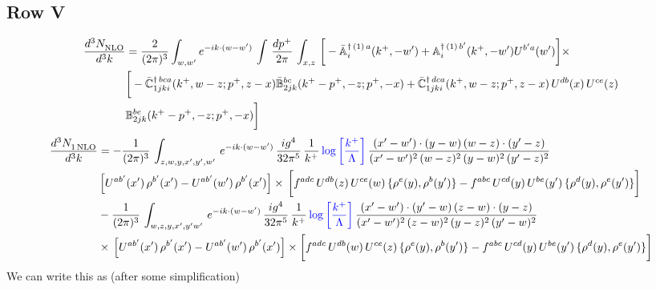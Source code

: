 \documentclass[9pt]{article}
\def\mf#1{\mathbb{#1}}
\numberwithin{equation}{section}
\begin{document}
\subsection{Row V}
\begin{align}
    \frac{d^{3}N_{\rm NLO}^{\rm}}{d^{3}k}  & = \frac{2}{(2\pi)^{3}}  \int_{w, w^\prime} e^{-ik\cdot (w-w')}\, \int\, \frac{dp^{+}}{2\pi}\,\int_{x,z}\, \bigg[-\bar{\mf{A}}^{\dagger\,(1)\,a}_{i}(k^{+},-w^{\prime})+\mf{A}^{\dagger\, (1)\, b^{\prime}}_{i}(k^{+},-w^{\prime})U^{b^{\prime}a}(w^{\prime})\bigg]\times\notag \\ & \bigg[-\Bar{\mf{C}}^{\dagger\, bca}_{1jki}(k^{+},w-z;p^{+},z-x)\Bar{\mf{B}}^{bc}_{2jk}(k^{+}-p^{+},- z;p^{+},-x)+\bar{\mf{C}}^{\dagger\, dca}_{1jki}(k^+,w-z; p^+, z-x)\,U^{db}(x)\,U^{ce}(z) \notag \\ & {\mf{B}}^{be}_{2jk} (k^{+}-p^+, -z; p^+, -x) \bigg]\nonumber
\end{align}
\begin{align}
     \frac{d^{3}N_{1\,\rm NLO}^{\rm}}{d^{3}k}  & =  -\frac{1}{(2\pi)^{3}}\, \int_{z,w,y,x',y',w'}\,e^{-ik\cdot (w-w^\prime)}\,\frac{ig^{4}}{32\pi^{5}}\, \frac{1}{k^{+}}\,{\color{blue}\log{\left[\frac{k^{+}}{\Lambda}\right]}}\,\frac{(x'-w')\cdot (y-w)\,(w-z)\cdot (y'-z)}{(x'-w')^{2}\,(w-z)^{2}\,(y-w)^{2}\,(y'-z)^{2}}\,\notag \\ & \left[U^{ab'}(x')\,\rho^{b'}(x')-U^{ab'}(w')\,\rho^{b'}(x')\right]\times\, \bigg[f^{adc}\,U^{db}(z)\,U^{ce}(w)\, \{\rho^{e}(y),\rho^{b}(y')\}-f^{abc}\,U^{cd}(y)\,U^{be}(y')\, \{\rho^{d}(y),\rho^{e}(y')\}\bigg]\notag \\ &  -\frac{1}{(2\pi)^{3}}\, \int_{w,z,y,x',y'w'}\,e^{-ik\cdot (w-w^\prime)}\,\frac{ig^{4}}{32\pi^{5}}\, \frac{1}{k^{+}}\,{\color{blue}\log{\left[\frac{k^{+}}{\Lambda}\right]}}\,\frac{(x'-w')\cdot (y'-w)\,(z-w)\cdot (y-z)}{(x'-w')^{2}\,(z-w)^{2}\,(y-z)^{2}\,(y'-w)^{2}}\notag \\ & \times\, \left[U^{ab'}(x')\,\rho^{b'}(x')-U^{ab'}(w')\,\rho^{b'}(x')\right]\times \bigg[f^{adc}\,U^{db}(w)\,U^{ce}(z)\, \{\rho^{e}(y),\rho^{b}(y')\}-f^{abc}\,U^{cd}(y)\,U^{be}(y')\, \{\rho^{d}(y),\rho^{e}(y')\}\bigg]
\end{align}
We can write this as (after some simplification)
\end{document}
